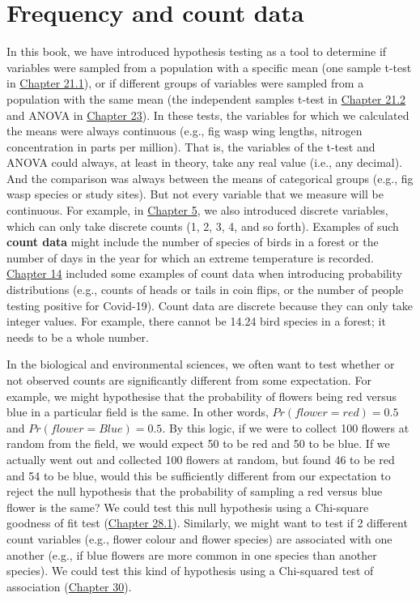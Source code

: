 \documentclass[
]{scrbook}
\begin{document}
\hypertarget{Chapter_28}{%
\chapter{Frequency and count data}\label{Chapter_28}}

In this book, we have introduced hypothesis testing as a tool to determine if variables were sampled from a population with a specific mean (one sample t-test in \protect\hyperlink{one-sample-t-test}{Chapter 21.1}), or if different groups of variables were sampled from a population with the same mean (the independent samples t-test in \protect\hyperlink{independent-samples-t-test}{Chapter 21.2} and ANOVA in \protect\hyperlink{Chapter_23}{Chapter 23}).
In these tests, the variables for which we calculated the means were always continuous (e.g., fig wasp wing lengths, nitrogen concentration in parts per million).
That is, the variables of the t-test and ANOVA could always, at least in theory, take any real value (i.e., any decimal).
And the comparison was always between the means of categorical groups (e.g., fig wasp species or study sites).
But not every variable that we measure will be continuous.
For example, in \protect\hyperlink{Chapter_5}{Chapter 5}, we also introduced discrete variables, which can only take discrete counts (1, 2, 3, 4, and so forth).
Examples of such \textbf{count data} might include the number of species of birds in a forest or the number of days in the year for which an extreme temperature is recorded.
\protect\hyperlink{Chapter_14}{Chapter 14} included some examples of count data when introducing probability distributions (e.g., counts of heads or tails in coin flips, or the number of people testing positive for Covid-19).
Count data are discrete because they can only take integer values.
For example, there cannot be 14.24 bird species in a forest; it needs to be a whole number.

In the biological and environmental sciences, we often want to test whether or not observed counts are significantly different from some expectation.
For example, we might hypothesise that the probability of flowers being red versus blue in a particular field is the same.
In other words, \(Pr(flower = red) = 0.5\) and \(Pr(flower = Blue) = 0.5\).
By this logic, if we were to collect 100 flowers at random from the field, we would expect 50 to be red and 50 to be blue.
If we actually went out and collected 100 flowers at random, but found 46 to be red and 54 to be blue, would this be sufficiently different from our expectation to reject the null hypothesis that the probability of sampling a red versus blue flower is the same?
We could test this null hypothesis using a Chi-square goodness of fit test (\protect\hyperlink{the-chi-square-distribution}{Chapter 28.1}).
Similarly, we might want to test if 2 different count variables (e.g., flower colour and flower species) are associated with one another (e.g., if blue flowers are more common in one species than another species).
We could test this kind of hypothesis using a Chi-squared test of association (\href{}{Chapter 30}).
\end{document}
